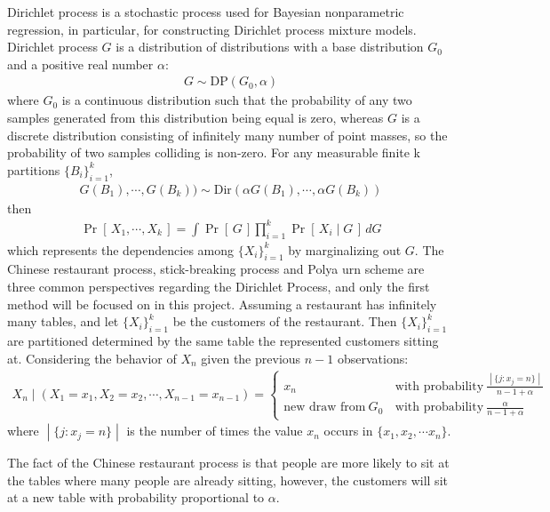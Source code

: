 \documentclass{article}
\newcommand{\prob}[1]{\operatorname{Pr}\left[\,#1\,\right]}
\def\cond{\; | \;}
\begin{document}
Dirichlet process is a stochastic process used for Bayesian nonparametric regression, in particular, for constructing Dirichlet process mixture models. Dirichlet process $G$ is a distribution of distributions with a base distribution $G_0$ and a positive real number $\alpha$:
\begin{align*}
G \sim \text{DP}(G_0, \alpha)
\end{align*}
where $G_0$ is a continuous distribution such that the probability of any two samples generated from this distribution being equal is zero, whereas $G$ is a discrete distribution consisting of infinitely many number of point masses,  so the probability of two samples colliding is non-zero.  For any measurable finite k partitions $\{B_i\}_{i=1}^k$,
\begin{align*}
G(B_1), \cdots, G(B_k))\sim \text{Dir}(\alpha G(B_1), \cdots, \alpha G(B_k))
\end{align*}
then
\begin{align*}
\prob{X_1, \cdots, X_k} = \int \prob{G} \prod_{i=1}^k \prob{X_i\cond G}\,dG
\end{align*}
which represents the dependencies among $\{X_i\}_{i=1}^k$ by marginalizing out $G$. The Chinese restaurant process, stick-breaking process and Polya urn scheme are three common perspectives regarding the Dirichlet Process, and only the first method will be focused on in this project.  Assuming a restaurant has infinitely many tables,  and let $\{X_i\}_{i=1}^k$ be the customers of the restaurant.  Then $\{X_i\}_{i=1}^k$ are partitioned determined by the same table the represented customers sitting at.  Considering the behavior of $X_n$ given the previous $n-1$ observations:
\begin{align*}
X_n\cond (X_1 = x_1, X_2 = x_2, \cdots,  X_{n-1} = x_{n-1}) = \left\{
\begin{array}{rl}
x_n \, &\text{with probability}\ \frac{\cond\{j : x_j = n\}\cond}{n - 1 + \alpha}\\
\text{new draw from}\ G_0\, &\text{with probability}\  \frac{\alpha}{n - 1 + \alpha}
\end{array}
\right.
\end{align*}
where $\cond \{j: x_j = n\}\cond$ is the number of times the value $x_n$ occurs in $\{x_1, x_2, \cdots x_n\}$.


The fact of the Chinese restaurant process is that people are more likely to sit at the tables where many people are already sitting, however,  the customers will sit at a new table with probability proportional to $\alpha$.\\
\end{document}
